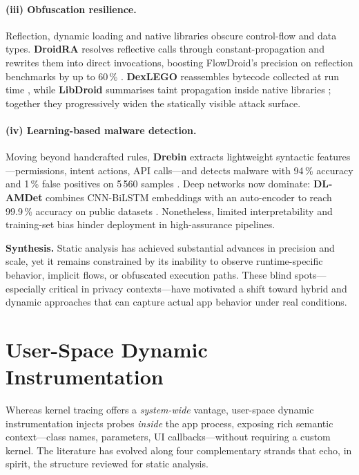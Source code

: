 \documentclass[a4paper,12pt]{report}
\begin{document}
\paragraph{(iii) Obfuscation resilience.}
Reflection, dynamic loading and native libraries obscure control-flow and data types.  \textbf{DroidRA} resolves reflective calls through constant-propagation and rewrites them into direct invocations, boosting FlowDroid’s precision on reflection benchmarks by up to 60\,\% \cite{li2016droidra}.  \textbf{DexLEGO} reassembles bytecode collected at run time \cite{ning2019dexlego}, while \textbf{LibDroid} summarises taint propagation inside native libraries \cite{libdroid2022}; together they progressively widen the statically visible attack surface.

\paragraph{(iv) Learning-based malware detection.}
Moving beyond handcrafted rules, \textbf{Drebin} extracts lightweight syntactic features—permissions, intent actions, API calls—and detects malware with 94\,\% accuracy and 1\,\% false positives on 5\,560 samples \cite{arp2014drebin}.  Deep networks now dominate: \textbf{DL-AMDet} combines CNN-BiLSTM embeddings with an auto-encoder to reach 99.9\,\% accuracy on public datasets \cite{nasser2023dlamdet}.  Nonetheless, limited interpretability and training-set bias hinder deployment in high-assurance pipelines.

\medskip
\noindent\textbf{Synthesis.}
Static analysis has achieved substantial advances in precision and scale, yet it remains constrained by its inability to observe runtime-specific behavior, implicit flows, or obfuscated execution paths. These blind spots—especially critical in privacy contexts—have motivated a shift toward hybrid and dynamic approaches that can capture actual app behavior under real conditions.

\section{User-Space Dynamic Instrumentation}
\label{sec:rw:dynamic:user}

Whereas kernel tracing offers a \emph{system-wide} vantage, user-space dynamic
instrumentation injects probes \emph{inside} the app process, exposing rich
semantic context—class names, parameters, UI callbacks—without requiring a
custom kernel.  The literature has evolved along four complementary strands
that echo, in spirit, the structure reviewed for static analysis.
\end{document}
